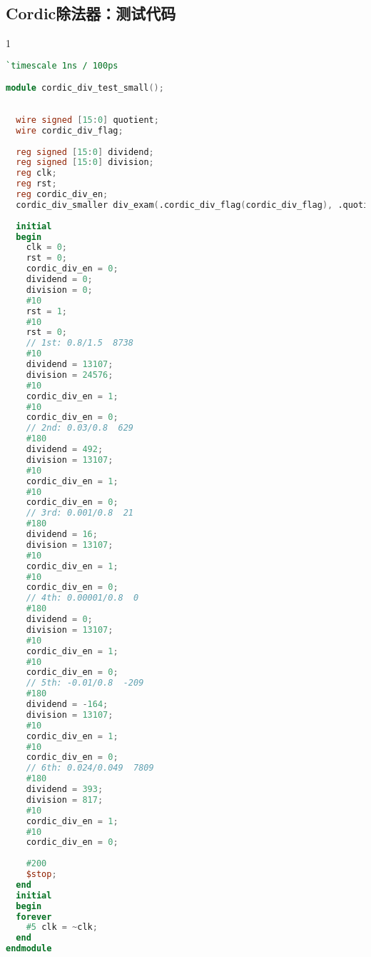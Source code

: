 \subsection{Cordic除法器：测试代码}
\begin{spacing}{1}
\begin{lstlisting}[language=Verilog]
`timescale 1ns / 100ps

module cordic_div_test_small();
  
  
  wire signed [15:0] quotient;
  wire cordic_div_flag;
  
  reg signed [15:0] dividend;
  reg signed [15:0] division;
  reg clk;
  reg rst;
  reg cordic_div_en;
  cordic_div_smaller div_exam(.cordic_div_flag(cordic_div_flag), .quotient(quotient), .dividend(dividend), .division(division), .clk(clk), .rst(rst), .cordic_div_en(cordic_div_en));
  
  initial
  begin
    clk = 0;
    rst = 0;
    cordic_div_en = 0;
    dividend = 0;
    division = 0;
    #10
    rst = 1;
    #10
    rst = 0;
    // 1st: 0.8/1.5  8738
    #10
    dividend = 13107;
    division = 24576;
    #10
    cordic_div_en = 1;
    #10
    cordic_div_en = 0;
    // 2nd: 0.03/0.8  629
    #180
    dividend = 492;
    division = 13107;
    #10
    cordic_div_en = 1;
    #10
    cordic_div_en = 0;
    // 3rd: 0.001/0.8  21
    #180
    dividend = 16;
    division = 13107;
    #10
    cordic_div_en = 1;
    #10
    cordic_div_en = 0;
    // 4th: 0.00001/0.8  0
    #180
    dividend = 0;
    division = 13107;
    #10
    cordic_div_en = 1;
    #10
    cordic_div_en = 0;
    // 5th: -0.01/0.8  -209
    #180
    dividend = -164;
    division = 13107;
    #10
    cordic_div_en = 1;
    #10
    cordic_div_en = 0;
    // 6th: 0.024/0.049  7809
    #180
    dividend = 393;
    division = 817;
    #10
    cordic_div_en = 1;
    #10
    cordic_div_en = 0;
    
    #200
    $stop;
  end
  initial
  begin
  forever
    #5 clk = ~clk;
  end
endmodule
\end{lstlisting}
\end{spacing}